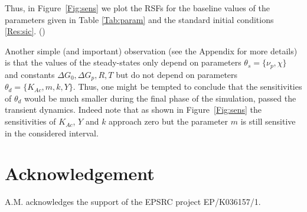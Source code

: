 \documentclass[a4paper, 12pt]{article}
\begin{document}
\smallskip

Thus, in Figure~\ref{Fig:sens} we plot the RSFs for the baseline values of the parameters  given in Table \ref{Tab:param} and the standard initial conditions \eqref{Res:sic}. ({\color{red}{ADAM:  Later discuss here which parameters are the most sensitive from RSF perspective}})

\smallskip

Another simple (and important) observation (see the Appendix for more details) is that the values of the steady-states  only depend on parameters $\theta_{s} = \{\nu_p, \chi\}$  and constants $\Delta G_0,  \Delta G_p, R, T$ but do not depend on parameters $\theta_d=\{K_{Ac}, m, k, Y\}$.  Thus, one might be tempted to conclude that the sensitivities of $\theta_d$ would be much smaller during the final phase of the simulation, passed the transient dynamics.  Indeed note that as shown in Figure~\ref{Fig:sens} the sensitivities of $K_{Ac}$, $Y$ and $k$ approach zero but the parameter $m$ is still sensitive in the considered interval. 


%
%

\section*{Acknowledgement}
A.M. acknowledges the support of the EPSRC project EP/K036157/1.





\clearpage
\end{document}
